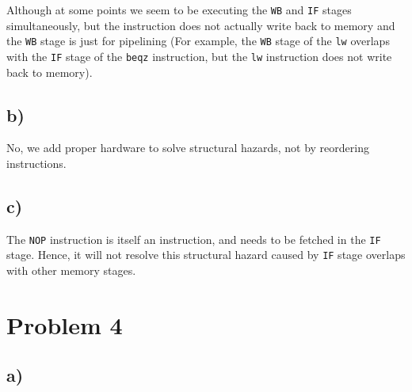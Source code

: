 \documentclass[a4paper,12pt]{article}
\begin{document}
Although at some points we seem to be executing the \texttt{WB} and \texttt{IF} stages simultaneously, but the instruction does not actually write back to memory and the \texttt{WB} stage is just for pipelining (For example, the \texttt{WB} stage of the \texttt{lw} overlaps with the \texttt{IF} stage of the \texttt{beqz} instruction, but the \texttt{lw} instruction does not write back to memory).

\subsection*{b)}

No, we add proper hardware to solve structural hazards, not by reordering instructions.

\subsection*{c)}

The \texttt{NOP} instruction is itself an instruction, and needs to be fetched in the \texttt{IF} stage.
Hence, it will not resolve this structural hazard caused by \texttt{IF} stage overlaps with other memory stages.

\section*{Problem 4}

\subsection*{a)}
\end{document}
